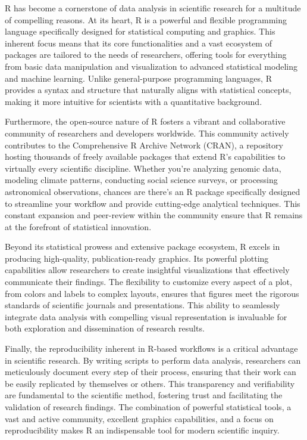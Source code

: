 \documentclass[
  letterpaper,
  DIV=11,
  numbers=noendperiod]{scrreprt}
\begin{document}
R has become a cornerstone of data analysis in scientific research for a
multitude of compelling reasons. At its heart, R is a powerful and
flexible programming language specifically designed for statistical
computing and graphics. This inherent focus means that its core
functionalities and a vast ecosystem of packages are tailored to the
needs of researchers, offering tools for everything from basic data
manipulation and visualization to advanced statistical modeling and
machine learning. Unlike general-purpose programming languages, R
provides a syntax and structure that naturally aligns with statistical
concepts, making it more intuitive for scientists with a quantitative
background.

Furthermore, the open-source nature of R fosters a vibrant and
collaborative community of researchers and developers worldwide. This
community actively contributes to the Comprehensive R Archive Network
(CRAN), a repository hosting thousands of freely available packages that
extend R's capabilities to virtually every scientific discipline.
Whether you're analyzing genomic data, modeling climate patterns,
conducting social science surveys, or processing astronomical
observations, chances are there's an R package specifically designed to
streamline your workflow and provide cutting-edge analytical techniques.
This constant expansion and peer-review within the community ensure that
R remains at the forefront of statistical innovation.

Beyond its statistical prowess and extensive package ecosystem, R excels
in producing high-quality, publication-ready graphics. Its powerful
plotting capabilities allow researchers to create insightful
visualizations that effectively communicate their findings. The
flexibility to customize every aspect of a plot, from colors and labels
to complex layouts, ensures that figures meet the rigorous standards of
scientific journals and presentations. This ability to seamlessly
integrate data analysis with compelling visual representation is
invaluable for both exploration and dissemination of research results.

Finally, the reproducibility inherent in R-based workflows is a critical
advantage in scientific research. By writing scripts to perform data
analysis, researchers can meticulously document every step of their
process, ensuring that their work can be easily replicated by themselves
or others. This transparency and verifiability are fundamental to the
scientific method, fostering trust and facilitating the validation of
research findings. The combination of powerful statistical tools, a vast
and active community, excellent graphics capabilities, and a focus on
reproducibility makes R an indispensable tool for modern scientific
inquiry.
\end{document}
